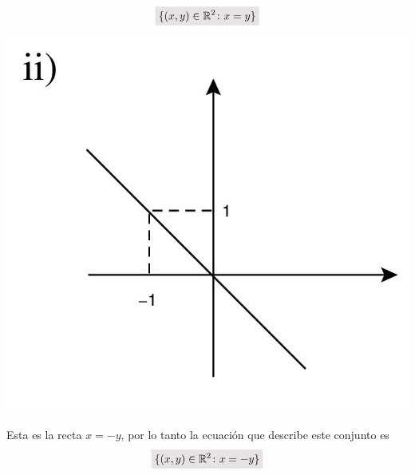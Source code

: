 \documentclass[a4paper,11pt]{article}
\newcommand{\real}{\mathbb{R}}
\newcommand{\resalta}[1]{\colorbox{g}{$\displaystyle #1$}}
\begin{document}
\begin{enumerate}
\begin{enumerate}[label = \roman*)]
\begin{minipage}[c]{0.7\linewidth}
\begin{equation}
                    \notag \resalta{\{(x,y)\in \real^{2} \colon x=y\}}
                \end{equation}
            \end{minipage}
            \begin{minipage}[c]{0.3\linewidth}
                \centering
                    \includegraphics[scale=0.15]{4ii-2}
            \end{minipage}
            \begin{minipage}[c]{0.7\linewidth}
                Esta es la recta $x=-y$, por lo tanto la ecuaci\'on que describe este conjunto es
                \begin{equation}
                    \notag \resalta{\{(x,y)\in \real^{2} \colon x=-y\}}
                \end{equation}
            \end{minipage}
            \begin{minipage}[c]{0.3\linewidth}
                \centering

\end{minipage}
\end{enumerate}
\end{enumerate}
\end{document}
